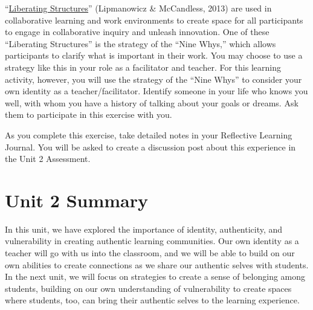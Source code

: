 \documentclass[
]{book}
\begin{document}
\begin{reflect}
``\href{https://www.liberatingstructures.com/ls-menu}{Liberating
Structures}'' (Lipmanowicz \& McCandless, 2013) are used in
collaborative learning and work environments to create space for all
participants to engage in collaborative inquiry and unleash innovation.
One of these ``Liberating Structures'' is the strategy of the ``Nine
Whys,'' which allows participants to clarify what is important in their
work. You may choose to use a strategy like this in your role as a
facilitator and teacher. For this learning activity, however, you will
use the strategy of the ``Nine Whys'' to consider your own identity as a
teacher/facilitator. Identify someone in your life who knows you well,
with whom you have a history of talking about your goals or dreams. Ask
them to participate in this exercise with you.


As you complete this exercise, take detailed notes in your Reflective
Learning Journal. You will be asked to create a discussion post about
this experience in the Unit 2 Assessment.
\end{reflect}

\hypertarget{unit-2-summary}{%
\section*{Unit 2 Summary}\label{unit-2-summary}}

In this unit, we have explored the importance of identity, authenticity, and vulnerability in creating authentic learning communities. Our own identity as a teacher will go with us into the classroom, and we will be able to build on our own abilities to create connections as we share our authentic selves with students. In the next unit, we will focus on strategies to create a sense of belonging among students, building on our own understanding of vulnerability to create spaces where students, too, can bring their authentic selves to the learning experience.
\end{document}
